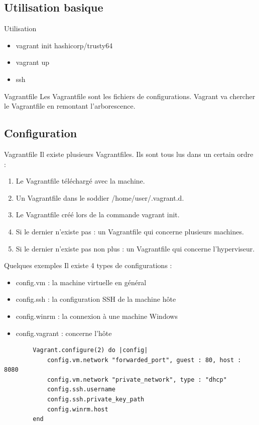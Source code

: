 \documentclass{beamer}
\begin{document}
    \subsection{Utilisation basique}
    \begin{frame}{Utilisation}
        \begin{itemize}
            \item{vagrant init hashicorp/trusty64}
            \item{vagrant up}
            \item{ssh}
        \end{itemize}
        \pause{}
        \begin{block}{Vagrantfile}
            Les Vagrantfile sont les fichiers de configurations. Vagrant va chercher le Vagrantfile en remontant l'arborescence.
        \end{block}
    \end{frame}

    \subsection{Configuration}
    \begin{frame}{Vagrantfile}
        Il existe plusieurs Vagrantfiles. Ils sont tous lus dans un certain ordre :
        \begin{enumerate}
            \item{Le Vagrantfile téléchargé avec la machine.}
            \item{Un Vagrantfile dans le soddier /home/user/.vagrant.d.}
            \item{Le Vagrantfile créé lors de la commande vagrant init.}
            \item{Si le dernier n'existe pas : un Vagrantfile qui concerne plusieurs machines.}
            \item{Si le dernier n'existe pas non plus : un Vagrantfile qui concerne l'hyperviseur.}
        \end{enumerate}
    \end{frame}

    \begin{frame}[containsverbatim]{Quelques exemples}
        Il existe 4 types de configurations :
        \begin{itemize}
            \item{config.vm : la machine virtuelle en général}
            \item{config.ssh : la configuration SSH de la machine hôte}
            \item{config.winrm : la connexion à une machine Windows}
            \item{config.vagrant : concerne l'hôte}
        \end{itemize}
        \begin{verbatim}
        Vagrant.configure(2) do |config|
            config.vm.network "forwarded_port", guest : 80, host : 8080
            config.vm.network "private_network", type : "dhcp"
            config.ssh.username
            config.ssh.private_key_path
            config.winrm.host
        end
        \end{verbatim}
    \end{frame}
\end{document}
